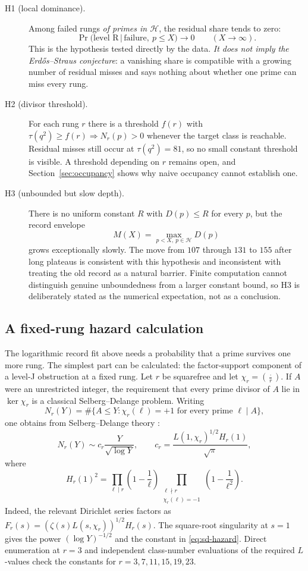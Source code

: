 \documentclass[11pt]{article}
\theoremstyle{definition}
\theoremstyle{remark}
\newcommand{\jac}[2]{\left(\tfrac{#1}{#2}\right)}
\begin{document}
\begin{description}
\item[H1 (local dominance).] Among failed rungs \emph{of primes in $\mathcal{H}$}, the
residual share tends to zero:
\[
\Pr\bigl(\text{level R} \,\big|\, \text{failure},\ p \le X\bigr) \longrightarrow 0
\qquad (X \to \infty).
\]
This is the hypothesis tested directly by the data. \emph{It does not imply the
Erd\H{o}s--Straus conjecture}: a vanishing share is compatible with a growing number of
residual misses and says nothing about whether one prime can miss every rung.
\item[H2 (divisor threshold).] For each rung $r$ there is a threshold $f(r)$ with
$\tau(q^2) \ge f(r) \Rightarrow N_r(p) > 0$ whenever the target class is reachable.
Residual misses still occur at $\tau(q^2)=81$, so no small constant threshold is
visible. A threshold depending on $r$ remains open, and Section~\ref{sec:occupancy}
shows why naive occupancy cannot establish one.
\item[H3 (unbounded but slow depth).] There is no uniform constant $R$ with
$D(p)\le R$ for every $p$, but the record envelope
\[
M(X)=\max_{p<X,\ p\in\mathcal H}D(p)
\]
grows exceptionally slowly. The move from $107$ through $131$ to $155$ after long
plateaus is
consistent with this hypothesis and inconsistent with treating the old record as a
natural barrier. Finite computation cannot distinguish genuine unboundedness from a
larger constant bound, so H3 is deliberately stated as the numerical expectation, not
as a conclusion.
\end{description}

\subsection{A fixed-rung hazard calculation}\label{sec:rung-hazard}

The logarithmic record fit above needs a probability that a prime survives one more
rung. The simplest part can be calculated: the factor-support component of a level-J
obstruction at a fixed rung. Let $r$ be squarefree and let
$\chi_r=\jac{\cdot}{r}$. If $A$ were an unrestricted integer, the requirement that
every prime divisor of $A$ lie in $\ker\chi_r$ is a classical
Selberg--Delange problem. Writing
\[
N_r(Y)=\#\{A\le Y:\chi_r(\ell)=+1\text{ for every prime }\ell\mid A\},
\]
one obtains from Selberg--Delange theory \cite[Ch.~II.5]{Tenenbaum2015}:
\begin{equation}\label{eq:sd-hazard}
N_r(Y)\sim c_r\frac{Y}{\sqrt{\log Y}},\qquad
c_r=\frac{L(1,\chi_r)^{1/2}H_r(1)}{\sqrt\pi},
\end{equation}
where
\[
H_r(1)^2=
\prod_{\ell\mid r}\left(1-\frac1\ell\right)
\prod_{\substack{\ell\nmid r\\ \chi_r(\ell)=-1}}
\left(1-\frac1{\ell^2}\right).
\]
Indeed, the relevant Dirichlet series factors as
$F_r(s)=(\zeta(s)L(s,\chi_r))^{1/2}H_r(s)$. The square-root singularity at
$s=1$ gives the power $(\log Y)^{-1/2}$ and the constant in
\eqref{eq:sd-hazard}. Direct enumeration at $r=3$ and independent class-number
evaluations of the required $L$-values check the constants for
$r=3,7,11,15,19,23$.
\end{document}
